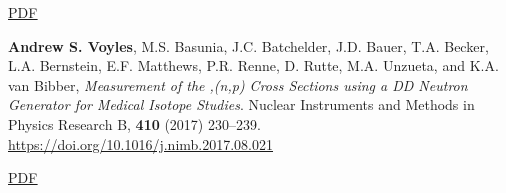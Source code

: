 \begin{bibsection}
\ifshort \vspace{0.1cm} \href{https://avoyles.github.io/papers/Ayllon2018_geochronology.pdf}{\underline{PDF}} \else  \fi 


\item \textbf{Andrew S. Voyles}, M.S. Basunia, J.C. Batchelder, J.D. Bauer, T.A. Becker, L.A. Bernstein, E.F. Matthews, P.R. Renne, D. Rutte, M.A. Unzueta, and K.A. van Bibber, \emph{Measurement of the ,(n,p) Cross Sections using a DD Neutron Generator for Medical Isotope Studies}. Nuclear Instruments and Methods in Physics Research  B, \textbf{410} (2017) 230--239. \url{https://doi.org/10.1016/j.nimb.2017.08.021}

\ifshort \vspace{0.1cm} \href{https://avoyles.github.io/papers/Voyles2017_HFNG.pdf}{\underline{PDF}} \else  \fi 











\end{bibsection}
